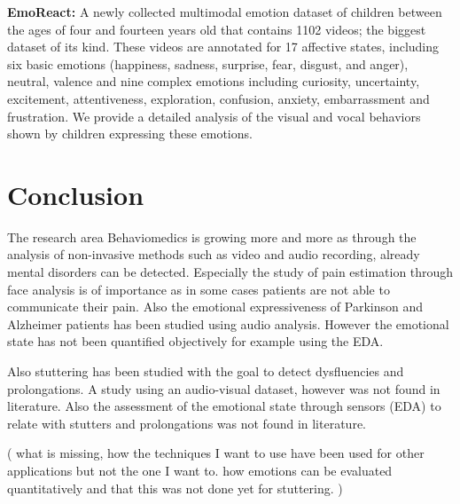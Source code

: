 \textbf{EmoReact:} A newly collected multimodal emotion dataset of children between the ages of four and fourteen years old that contains 1102 videos; the biggest dataset of its kind. These videos are annotated for 17 affective states, including six basic emotions (happiness, sadness, surprise, fear, disgust, and anger), neutral, valence and nine complex emotions including curiosity, uncertainty, excitement, attentiveness, exploration, confusion, anxiety, embarrassment and frustration. We provide a detailed analysis of the visual and vocal behaviors shown by children expressing these emotions.








\section{Conclusion}

The research area Behaviomedics is growing more and more as through the analysis of non-invasive methods such as video and audio recording, already mental disorders can be detected. Especially the study of pain estimation through face analysis is of importance as in some cases patients are not able to communicate their pain. Also the emotional expressiveness of Parkinson and Alzheimer patients has been studied using audio analysis. However the emotional state has not been quantified objectively for example using the EDA. 

Also stuttering has been studied with the goal to detect dysfluencies and prolongations. A study using an audio-visual dataset, however was not found in literature. Also the assessment of the emotional state through sensors (EDA) to relate with stutters and prolongations was not found in literature.


( what is missing, how the techniques I want to use have been used for other applications but not the one I want to. how emotions can be evaluated quantitatively and that this was not done yet for stuttering. )

